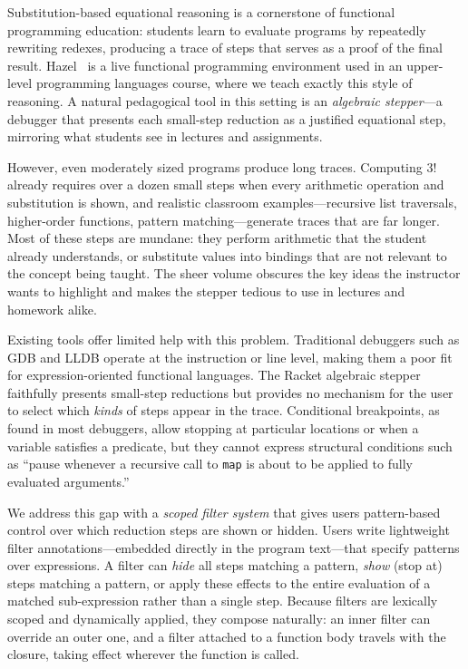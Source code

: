 Substitution-based equational reasoning is a cornerstone of functional
programming education: students learn to evaluate programs by
repeatedly rewriting redexes, producing a trace of steps that serves
as a proof of the final result. Hazel~\cite{omar2017hazelnut} is a
live functional programming environment used in an upper-level
programming languages course, where we teach exactly this style of
reasoning. A natural pedagogical tool in this setting is an
\emph{algebraic stepper}---a debugger that presents each small-step
reduction as a justified equational step, mirroring what students see
in lectures and assignments.

However, even moderately sized programs produce long traces. Computing
\(3!\) already requires over a dozen small steps when every
arithmetic operation and substitution is shown, and realistic
classroom examples---recursive list traversals, higher-order
functions, pattern matching---generate traces that are far longer.
Most of these steps are mundane: they perform arithmetic that the
student already understands, or substitute values into bindings that
are not relevant to the concept being taught. The sheer volume
obscures the key ideas the instructor wants to highlight and makes the
stepper tedious to use in lectures and homework alike.

Existing tools offer limited help with this problem. Traditional
debuggers such as GDB and LLDB operate at the instruction or line
level, making them a poor fit for expression-oriented functional
languages. The Racket algebraic stepper~\cite{clements2001stepper}
faithfully presents small-step reductions but provides no mechanism
for the user to select which \emph{kinds} of steps appear in the
trace. Conditional breakpoints, as found in most debuggers, allow
stopping at particular locations or when a variable satisfies a
predicate, but they cannot express structural conditions such as
``pause whenever a recursive call to \texttt{map} is about to be
applied to fully evaluated arguments.''

We address this gap with a \emph{scoped filter system} that gives
users pattern-based control over which reduction steps are shown or
hidden. Users write lightweight filter annotations---embedded directly
in the program text---that specify patterns over expressions. A filter
can \emph{hide} all steps matching a pattern, \emph{show} (stop at) steps
matching a pattern, or apply these effects to the entire evaluation of
a matched sub-expression rather than a single step. Because filters
are lexically scoped and dynamically applied, they compose naturally:
an inner filter can override an outer one, and a filter attached to a
function body travels with the closure, taking effect wherever the
function is called.

